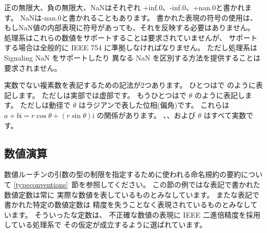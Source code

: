 正の無限大、負の無限大、NaNはそれぞれ
{\cf +inf.0}、{\cf -inf.0}、{\cf +nan.0}と書かれます。
NaNは{\cf -nan.0}と書かれることもあります。
書かれた表現の符号の使用は、もしNaN値の内部表現に符号があっても、それを反映する必要はありません。
処理系はこれらの数値をサポートすることは要求されていませんが、
サポートする場合は全般的に IEEE 754 に準拠しなければなりません。
ただし処理系は Signaling NaN をサポートしたり
異なる NaN を区別する方法を提供することは要求されません。

実数でない複素数を表記するための記法が2つあります。
ひとつはで  のように表記します。
ただしは実部では虚部です。
もうひとつはで $\theta$ のように表記します。
ただしは動径で $\theta$ はラジアンで表した位相(偏角)です。
これらは
$a+b\mathrm{i} = r \cos\theta + (r \sin\theta) \mathrm{i}$
の関係があります。
、、および $\theta$ はすべて実数です。


\subsection{数値演算}

数値ルーチンの引数の型の制限を指定するために使われる命名規約の要約について
\ref{typeconventions}~節を参照してください。
この節の例ではな表記で書かれた数値定数は常に
実際な数値を表しているものとみなしています。
またな表記で書かれた特定の数値定数は
精度を失うことなく表現されているものとみなしています。
そういったな定数は、
不正確な数値の表現に IEEE 二進倍精度を採用している処理系で
その仮定が成立するように選ばれています。


